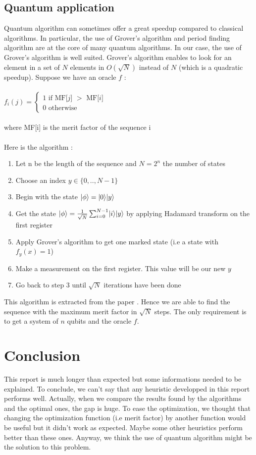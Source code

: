 \documentclass[a4paper,11pt,openany]{article}
\begin{document}
\subsection{Quantum application}
\DeclarePairedDelimiter\bra{\langle}{\rvert}
\DeclarePairedDelimiter\ket{\lvert}{\rangle}
\noindent
Quantum algorithm can sometimes offer a great speedup compared to classical algorithms. In particular, the use of Grover's algorithm \cite{search} and period finding algorithm are at the core of many quantum algorithms. In our case, the use of Grover's algorithm is well suited. Grover's algorithm enables to look for an element in a set of $N$ elements in $O(\sqrt{N})$ instead of $N$ (which is a quadratic speedup).
Suppose we have an oracle $f$ :\\\\
$f_i(j)=\left\{
\begin{array}{l}
  1 \text{ if MF[$j$] $>$ MF[$i$]} \\
  0 \text{ otherwise}
\end{array}
\right.$\\\\
where MF[i] is the merit factor of the sequence i\\\\
Here is the algorithm :
\begin{enumerate}
\item Let n be the length of the sequence and $N=2^n$ the number of states
\item Choose an index $y \in \{0,..,N-1\}$
\item Begin with the state $\ket{\phi}=\ket{0}\ket{y}$
\item Get the state $\ket{\phi}=\frac{1}{\sqrt{N}}\sum_{i=0}^{N-1}\ket{i}\ket{y}$ by applying Hadamard transform on the first register
\item Apply Grover's algorithm to get one marked state (i.e a state with $f_y(x)=1$)
\item Make a measurement on the first register. This value will be our new $y$
\item Go back to step 3 until $\sqrt{N}$ iterations have been done
\end{enumerate}
This algorithm is extracted from the paper \cite{max_quantum}. Hence we are able to find the sequence with the maximum merit factor in $\sqrt{N}$ steps. The only requirement is to get a system of $n$ qubits and the oracle $f$.
\section{Conclusion}
\noindent
This report is much longer than expected but some informations needed to be explained. To conclude, we can't say that any heuristic developped in this report performs well. Actually, when we compare the results found by the algorithms and the optimal ones, the gap is huge. To ease the optimization, we thought that changing the optimization function (i.e merit factor) by another function would be useful but it didn't work as expected. Maybe some other heuristics perform better than these ones. Anyway, we think the use of quantum algorithm might be the solution to this problem.
\end{document}
